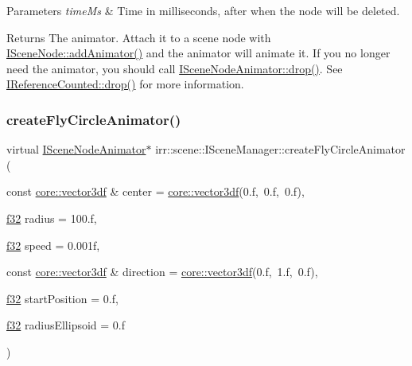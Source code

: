 \begin{DoxyParams}{Parameters}
{\em time\+Ms} & Time in milliseconds, after when the node will be deleted. \\
\hline
\end{DoxyParams}
\begin{DoxyReturn}{Returns}
The animator. Attach it to a scene node with \hyperlink{classirr_1_1scene_1_1ISceneNode_a0e5cd342cd7293c136e53e2c2c5e0f3a}{I\+Scene\+Node\+::add\+Animator()} and the animator will animate it. If you no longer need the animator, you should call \hyperlink{classirr_1_1IReferenceCounted_a03856a09355b89d178090c4a5f738543}{I\+Scene\+Node\+Animator\+::drop()}. See \hyperlink{classirr_1_1IReferenceCounted_a03856a09355b89d178090c4a5f738543}{I\+Reference\+Counted\+::drop()} for more information. 
\end{DoxyReturn}
\mbox{\label{classirr_1_1scene_1_1ISceneManager_a2e49ff49bc9e88e8ecf3d681354e1ab6}} 
\subsubsection{\texorpdfstring{create\+Fly\+Circle\+Animator()}{createFlyCircleAnimator()}\hspace{0.1cm}{\footnotesize\ttfamily [1/2]}}
{\footnotesize\ttfamily virtual \hyperlink{classirr_1_1scene_1_1ISceneNodeAnimator}{I\+Scene\+Node\+Animator}$\ast$ irr\+::scene\+::\+I\+Scene\+Manager\+::create\+Fly\+Circle\+Animator (\begin{DoxyParamCaption}\item[{const \hyperlink{namespaceirr_1_1core_ae6e2b2a6c552833ebbd5b7463d03586b}{core\+::vector3df} \&}]{center = {\ttfamily \hyperlink{namespaceirr_1_1core_ae6e2b2a6c552833ebbd5b7463d03586b}{core\+::vector3df}(0.f,~0.f,~0.f)},  }\item[{\hyperlink{namespaceirr_a0277be98d67dc26ff93b1a6a1d086b07}{f32}}]{radius = {\ttfamily 100.f},  }\item[{\hyperlink{namespaceirr_a0277be98d67dc26ff93b1a6a1d086b07}{f32}}]{speed = {\ttfamily 0.001f},  }\item[{const \hyperlink{namespaceirr_1_1core_ae6e2b2a6c552833ebbd5b7463d03586b}{core\+::vector3df} \&}]{direction = {\ttfamily \hyperlink{namespaceirr_1_1core_ae6e2b2a6c552833ebbd5b7463d03586b}{core\+::vector3df}(0.f,~1.f,~0.f)},  }\item[{\hyperlink{namespaceirr_a0277be98d67dc26ff93b1a6a1d086b07}{f32}}]{start\+Position = {\ttfamily 0.f},  }\item[{\hyperlink{namespaceirr_a0277be98d67dc26ff93b1a6a1d086b07}{f32}}]{radius\+Ellipsoid = {\ttfamily 0.f} }\end{DoxyParamCaption})\hspace{0.3cm}{\ttfamily [pure virtual]}}



